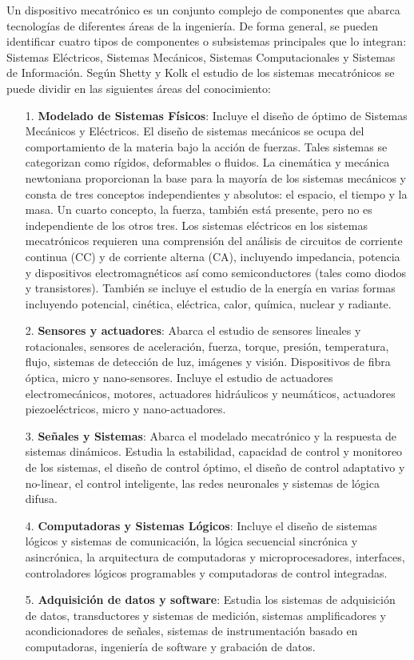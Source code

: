 Un dispositivo mecatrónico es un conjunto complejo de componentes que abarca tecnologías de diferentes áreas de la ingeniería. De forma general, se pueden identificar cuatro tipos de componentes o subsistemas principales que lo integran: Sistemas Eléctricos, Sistemas Mecánicos, Sistemas Computacionales y Sistemas de Información.  Según  Shetty y Kolk \cite{shetty_mechatronics_2010} el estudio de los sistemas mecatrónicos se puede dividir en las siguientes áreas del conocimiento:
	
	\begin{itemize}
	\item[1.]\textbf{Modelado de Sistemas Físicos}: Incluye el diseño de óptimo de Sistemas Mecánicos y Eléctricos. El diseño de sistemas mecánicos se ocupa del comportamiento de la materia bajo la acción de fuerzas. Tales sistemas se categorizan como rígidos, deformables o fluidos. La cinemática y mecánica newtoniana proporcionan la base para la mayoría de los sistemas mecánicos y consta de tres conceptos independientes y absolutos: el espacio, el tiempo y la masa. Un cuarto concepto, la fuerza, también está presente, pero no es independiente de los otros tres. Los sistemas eléctricos en los sistemas mecatrónicos requieren una comprensión del análisis de circuitos de corriente continua (CC) y de corriente alterna (CA), incluyendo impedancia, potencia y dispositivos electromagnéticos así como semiconductores (tales como diodos y transistores). También se incluye el estudio de la energía en varias formas incluyendo potencial, cinética, eléctrica, calor, química, nuclear y radiante.
	\item[2.]\textbf{Sensores y actuadores}: Abarca el estudio de sensores lineales y rotacionales, sensores de aceleración, fuerza, torque, presión, temperatura, flujo, sistemas de detección de luz, imágenes y visión. Dispositivos de fibra óptica, micro y nano-sensores. Incluye el estudio de actuadores electromecánicos, motores, actuadores hidráulicos y neumáticos, actuadores piezoeléctricos, micro y nano-actuadores.
	\item[3.]\textbf{Señales y Sistemas}: Abarca el modelado mecatrónico y la respuesta de sistemas dinámicos. Estudia la estabilidad, capacidad de control y monitoreo de los sistemas, el diseño de control óptimo, el diseño de control adaptativo y no-linear, el control inteligente, las redes neuronales y sistemas de lógica difusa.
	\item[4.]\textbf{Computadoras y Sistemas Lógicos}: Incluye el diseño de sistemas lógicos y sistemas de comunicación, la lógica secuencial sincrónica y asincrónica, la arquitectura de computadoras y microprocesadores, interfaces, controladores lógicos programables y computadoras de control integradas.
	\item[5.]\textbf{Adquisición de datos y software}: Estudia los sistemas de adquisición de datos, transductores y sistemas de medición, sistemas amplificadores y acondicionadores de señales, sistemas de instrumentación basado en computadoras, ingeniería de software y grabación de datos.
	
\end{itemize}

